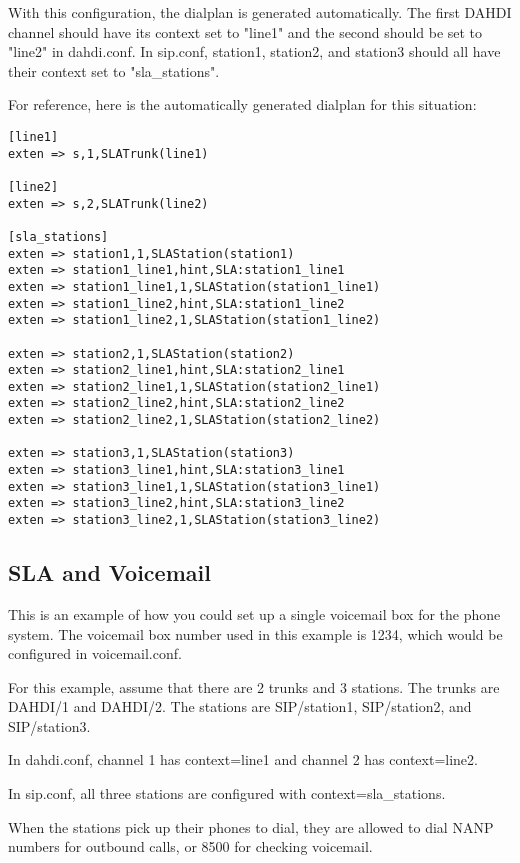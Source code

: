 With this configuration, the dialplan is generated automatically.  The first
DAHDI channel should have its context set to "line1" and the second should be
set to "line2" in dahdi.conf.  In sip.conf, station1, station2, and station3
should all have their context set to "sla\_stations".

For reference, here is the automatically generated dialplan for this situation:
\begin{astlisting}
\begin{verbatim}
[line1]
exten => s,1,SLATrunk(line1)

[line2]
exten => s,2,SLATrunk(line2)

[sla_stations]
exten => station1,1,SLAStation(station1)
exten => station1_line1,hint,SLA:station1_line1
exten => station1_line1,1,SLAStation(station1_line1)
exten => station1_line2,hint,SLA:station1_line2
exten => station1_line2,1,SLAStation(station1_line2)

exten => station2,1,SLAStation(station2)
exten => station2_line1,hint,SLA:station2_line1
exten => station2_line1,1,SLAStation(station2_line1)
exten => station2_line2,hint,SLA:station2_line2
exten => station2_line2,1,SLAStation(station2_line2)

exten => station3,1,SLAStation(station3)
exten => station3_line1,hint,SLA:station3_line1
exten => station3_line1,1,SLAStation(station3_line1)
exten => station3_line2,hint,SLA:station3_line2
exten => station3_line2,1,SLAStation(station3_line2)	
\end{verbatim}
\end{astlisting}

\subsection{SLA and Voicemail}
\label{voicemail}

This is an example of how you could set up a single voicemail box for the
phone system.  The voicemail box number used in this example is 1234, which
would be configured in voicemail.conf.

For this example, assume that there are 2 trunks and 3 stations.  The trunks
are DAHDI/1 and DAHDI/2.  The stations are SIP/station1, SIP/station2, and
SIP/station3.

In dahdi.conf, channel 1 has context=line1 and channel 2 has context=line2.

In sip.conf, all three stations are configured with context=sla\_stations.

When the stations pick up their phones to dial, they are allowed to dial
NANP numbers for outbound calls, or 8500 for checking voicemail.



